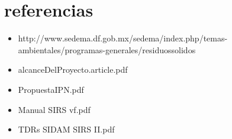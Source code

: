 \section{referencias}
\begin{itemize}
	\item http://www.sedema.df.gob.mx/sedema/index.php/temas-ambientales/programas-generales/residuossolidos
	\item alcanceDelProyecto.article.pdf
	\item PropuestaIPN.pdf
	\item Manual SIRS vf.pdf
	\item TDRs SIDAM SIRS II.pdf
\end{itemize}

